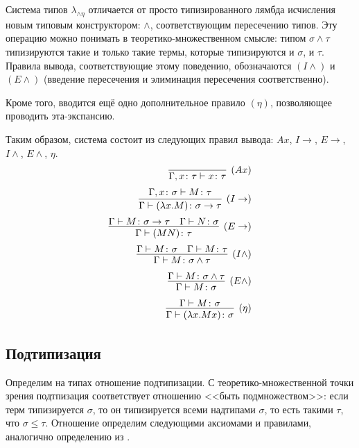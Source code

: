 \documentclass[../main.tex]{subfiles}
\begin{document}
\label{sec:the_system}

Система типов $\lambda_{\wedge \eta}$ отличается от просто типизированного лямбда исчисления новым типовым конструктором: $\wedge$, соответствующим пересечению типов. Эту операцию можно понимать в теоретико-множественном смысле: типом $\sigma \wedge \tau$ типизируются такие и только такие термы, которые типизируются и $\sigma$, и $\tau$. Правила вывода, соответствующие этому поведению, обозначаются $(I\wedge)$ и $(E\wedge)$ (введение пересечения и элиминация пересечения соответственно). 

Кроме того, вводится ещё одно дополнительное правило $(\eta)$, позволяющее проводить эта-экспансию. 

Таким образом, система состоит из следующих правил вывода: $Ax$, $I\to$, $E\to$, $I\wedge$, $E\wedge$, $\eta$.
\begin{equation} \label{rules eta}
\begin{aligned}
\infer[(Ax)]{\Gamma, x \colon \tau \vdash x \colon \tau}{}\\[2pt]
\infer[(I\to)]{\Gamma \vdash (\lambda x . M) \colon \sigma \to \tau}{\Gamma, x \colon \sigma \vdash M \colon \tau}\\[2pt]
\infer[(E\to)]{\Gamma \vdash (MN) \colon \tau}{\Gamma \vdash M \colon \sigma \to \tau & \Gamma \vdash N \colon \sigma}\\[2pt]
\infer[(I\wedge)]{\Gamma \vdash M \colon \sigma \wedge \tau}{\Gamma \vdash M \colon \sigma & \Gamma \vdash M \colon \tau}\\[2pt]
\infer[(E\wedge)]{\Gamma \vdash M \colon \sigma}{\Gamma \vdash M \colon \sigma \wedge \tau}\\[2pt]
\infer[(\eta)]{\Gamma \vdash (\lambda x . M x) \colon \sigma}{\Gamma \vdash M \colon \sigma}

\end{aligned}
\end{equation}

\subsection{Подтипизация}


Определим на типах отношение подтипизации. С теоретико-множественной точки зрения подтпизация соответствует отношению <<быть подмножеством>>: если терм типизируется $\sigma$, то он типизируется всеми надтипами $\sigma$, то есть такими $\tau$, что $\sigma \leqslant \tau$. Отношение определим следующими аксиомами и правилами, аналогично определению из \cite{hindley_1982}.
\newpage
\end{document}
